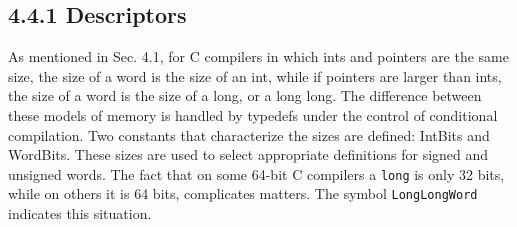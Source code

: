 \subsection[4.4.1 Descriptors]{4.4.1 Descriptors}

As mentioned in Sec. 4.1, for C compilers in which ints and pointers
are the same size, the size of a word is the size of an int, while if
pointers are larger than ints, the size of a word is the size of a
long, or a long long. The difference between these models of memory is
handled by typedefs under the control of conditional compilation. Two
constants that characterize the sizes are defined: IntBits and
WordBits. These sizes are used to select appropriate definitions for
signed and unsigned words. The fact that on some 64-bit C compilers a
\texttt{long} is only 32 bits, while on others it is 64 bits,
complicates matters. The symbol \texttt{LongLongWord} indicates this
situation.

\bigskip



